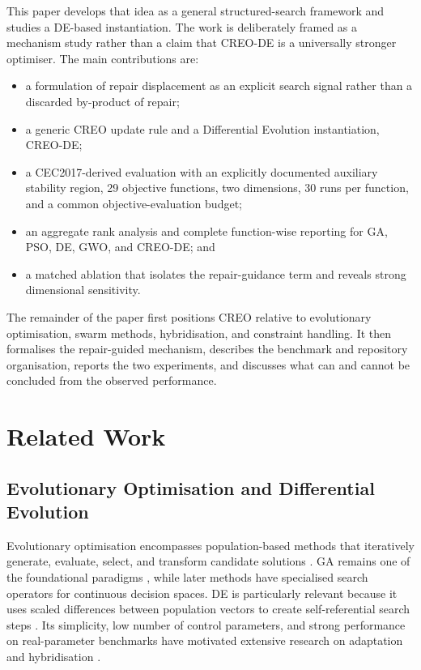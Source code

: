 \documentclass[journal]{IEEEtran}
\begin{document}
This paper develops that idea as a general structured-search framework and studies a DE-based instantiation. The work is deliberately framed as a mechanism study rather than a claim that CREO-DE is a universally stronger optimiser. The main contributions are:
\begin{itemize}
    \item a formulation of repair displacement as an explicit search signal rather than a discarded by-product of repair;
    \item a generic CREO update rule and a Differential Evolution instantiation, CREO-DE;
    \item a CEC2017-derived evaluation with an explicitly documented auxiliary stability region, 29 objective functions, two dimensions, 30 runs per function, and a common objective-evaluation budget;
    \item an aggregate rank analysis and complete function-wise reporting for GA, PSO, DE, GWO, and CREO-DE; and
    \item a matched ablation that isolates the repair-guidance term and reveals strong dimensional sensitivity.
\end{itemize}

The remainder of the paper first positions CREO relative to evolutionary optimisation, swarm methods, hybridisation, and constraint handling. It then formalises the repair-guided mechanism, describes the benchmark and repository organisation, reports the two experiments, and discusses what can and cannot be concluded from the observed performance.

\section{Related Work}

\subsection{Evolutionary Optimisation and Differential Evolution}

Evolutionary optimisation encompasses population-based methods that iteratively generate, evaluate, select, and transform candidate solutions \cite{back1996evolutionary,eiben2003introduction}. GA remains one of the foundational paradigms \cite{holland1992adaptation}, while later methods have specialised search operators for continuous decision spaces. DE is particularly relevant because it uses scaled differences between population vectors to create self-referential search steps \cite{storn1997differential}. Its simplicity, low number of control parameters, and strong performance on real-parameter benchmarks have motivated extensive research on adaptation and hybridisation \cite{das2011differential}.
\end{document}
